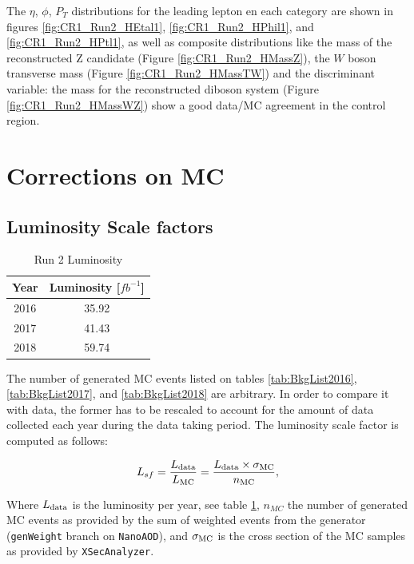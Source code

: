 The $\eta$, $\phi$, $P_{T}$ distributions for the leading lepton en each category
are shown in figures \ref{fig:CR1_Run2_HEtal1}, \ref{fig:CR1_Run2_HPhil1}, and
\ref{fig:CR1_Run2_HPtl1}, as well as composite distributions like the mass of the
reconstructed Z candidate (Figure \ref{fig:CR1_Run2_HMassZ}), the $W$ boson transverse mass
(Figure \ref{fig:CR1_Run2_HMassTW}) and the discriminant variable: the mass for the
reconstructed diboson system (Figure \ref{fig:CR1_Run2_HMassWZ}) show a good data/MC
agreement in the control region.


\section{Corrections on MC}

\subsection{Luminosity Scale factors}

\begin{table}
  \caption{Run 2 Luminosity}
 \begin{center}
 \begin{tabular}{cc}\hline\hline
 Year & Luminosity [$fb^{-1}$] \\ \hline\hline
 2016 & 35.92  \\
 2017 & 41.43 \\
 2018 & 59.74 \\
 \end{tabular}
 \end{center}
 \label{tab:LuminosityPerYear}
\end{table}

The number of generated MC events listed on tables \ref{tab:BkgList2016}, \ref{tab:BkgList2017},
and \ref{tab:BkgList2018} are arbitrary. In order to compare it with data, the
former has to be rescaled to account for the amount of data collected each year
during the data taking period. The luminosity scale factor is computed as follows:

\begin{equation}
  L_{sf}=\frac{L_{\rm data}}{L_{\rm MC}} = \frac{L_{\rm data}\times\sigma_{\rm MC}}{n_{\rm MC}},
\label{eq:lumiSF}
\end{equation}

Where $L_{\rm data}$ is the luminosity per year, see table \ref{tab:LuminosityPerYear},
$n_{MC}$ the number of generated MC events as provided by the sum of weighted events
from the generator (\verb|genWeight| branch on \verb|NanoAOD|), and $\sigma_{\rm MC}$
is the cross section of the MC samples as provided by \verb|XSecAnalyzer|.

